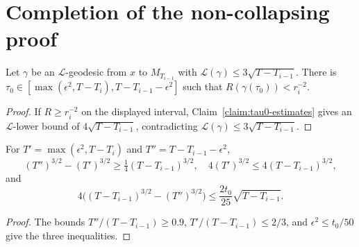 \section{Completion of the non-collapsing proof}
\label{Lgamma1}

\begin{claim}
\label{claim:existence-of-tau0-low-curvature-point}\label{tau0cl}
Let $\gamma$ be an $\mathcal L$-geodesic from $x$ to $M_{T_{i-1}}$ with $\mathcal L(\gamma)\leq3\sqrt{T-T_{i-1}}$. There is $\tau_0\in[\max(\epsilon^2,T-T_i),T-T_{i-1}-\epsilon^2]$ such that $R(\gamma(\tau_0))<r_i^{-2}$.
\end{claim}
\begin{proof}
\sketch If $R\geq r_i^{-2}$ on the displayed interval, Claim~\ref{claim:tau0-estimates} gives an $\mathcal L$-lower bound of $4\sqrt{T-T_{i-1}}$, contradicting $\mathcal L(\gamma)\leq3\sqrt{T-T_{i-1}}$.
\end{proof}

\begin{claim}
\label{claim:tau0-estimates}
For $T'=\max(\epsilon^2,T-T_i)$ and $T''=T-T_{i-1}-\epsilon^2$,
\[
(T'')^{3/2}-(T')^{3/2}\geq\tfrac14(T-T_{i-1})^{3/2},\quad
4(T')^{3/2}\leq4(T-T_{i-1})^{3/2},
\]
and
\[
4\bigl((T-T_{i-1})^{3/2}-(T'')^{3/2}\bigr)
\leq\frac{2t_0}{25}\sqrt{T-T_{i-1}}.
\]
\end{claim}
\begin{proof}
\sketch The bounds $T''/(T-T_{i-1})\geq0.9$, $T'/(T-T_{i-1})\leq2/3$, and $\epsilon^2\leq t_0/50$ give the three inequalities.
\end{proof}
